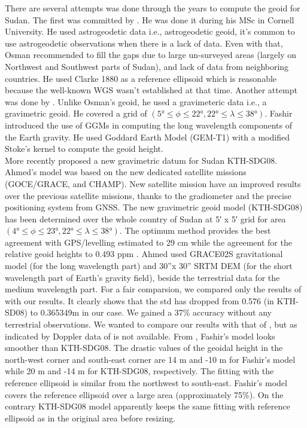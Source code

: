 There are several attempts was done through the years to compute the geoid for Sudan. The first was committed by \cite{osman}. He was done it during his MSc in Cornell University. He used astrogeodetic data i.e., astrogeodetic geoid, it's common to use astrogeodetic observations when there is a lack of data. Even with that, Osman recommended to fill the gaps due to large un-surveyed areas (largely on Northwest and Southwest parts of Sudan), and lack of data from neighboring countries. He used Clarke 1880 as a reference ellipsoid which is reasonable because the well-known WGS wasn't established at that time. Another attempt was done by \cite{fashir}. Unlike Osman's geoid, he used a gravimeteric data i.e., a gravimetric geoid. He covered a grid of $(5 \si{\degree} \le \phi \le 22 \si{\degree} , 22 \si{\degree} \le \lambda \le 38\si{\degree})$. Fashir introduced the use of GGMs in computing the long wavelength components of the Earth gravity. He used Goddard Earth Model (GEM-T1) with a modified Stoke's kernel to compute the geoid height.\\
More recently \citep{ahmed_msc} proposed a new gravimetric datum for Sudan KTH-SDG08. Ahmed's model was based on the new dedicated satellite missions (GOCE/GRACE, and CHAMP). New satellite mission have an improved results over the previous satellite missions, thanks to the gradiometer and the precise positioning system from GNSS. The new gravimetric geoid model (KTH-SDG08) has been determined over the whole country of Sudan at 5′ x 5′ grid for area $(4 \si{\degree} \le \phi \le 23 \si{\degree}, 22 \si{\degree} \le \lambda \le 38 \si{\degree})$. The optimum method provides the best agreement with GPS/levelling estimated to 29 cm while the agreement for the relative geoid heights to 0.493 ppm \cite{ahmed_msc}. Ahmed used GRACE02S gravitational model (for the long wavelength part) and 30”x 30” SRTM DEM (for the short wavelength part of Earth's gravity field), beside the terrestrial data for the medium wavelength part. For a fair comparsion, we compared only the results of \cite{ahmed_msc} with our results. It clearly shows that the std has dropped from 0.576 (in KTH-SD08) to 0.365349m in our case. We gained a 37\% accuracy without any terrestrial observations.
We wanted to compare our results with that of \cite{fashir}, but as indicated by \cite{ahmed_msc} Doppler data of \cite{fashir} is not available. From \cite{ahmed_msc}, Fashir’s model looks smoother than KTH-SDG08. The drastic values of the geoidal height in the north-west corner and south-east corner are 14 m and -10 m for Fashir’s model while 20 m and -14 m for KTH-SDG08, respectively. The fitting with the reference ellipsoid is similar from the northwest to south-east. Fashir’s model covers the reference ellipsoid over a large area
(approximately 75\%). On the contrary KTH-SDG08 model apparently keeps the same fitting
with reference ellipsoid as in the original area before resizing.


